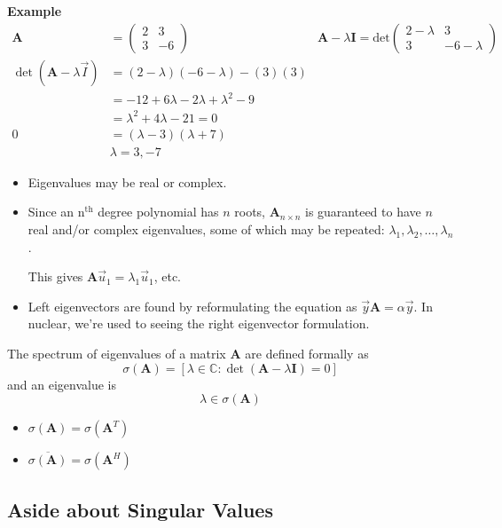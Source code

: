 \documentclass[12pt]{article}
\newcommand{\nth}{n\ensuremath{^{\text{th}}} }
\newcommand{\ve}[1]{\ensuremath{\mathbf{#1}}}
\newcommand{\cc}[1]{\ensuremath{\overline{#1}}}
\begin{document}
\textbf{Example}
\begin{align}
    \ve{A} &= \begin{pmatrix}
        2 & 3 \\
        3 & -6
    \end{pmatrix} 
    &\ve{A} - \lambda \ve{I} = \text{det}\begin{pmatrix}
        2 - \lambda & 3 \\
        3 & -6 - \lambda
    \end{pmatrix} \nonumber \\
%  
\det(\ve{A} - \lambda \vec{I}) &= (2 - \lambda)(-6 - \lambda) - (3)(3) \nonumber \\
%
&= -12 + 6\lambda -2\lambda + \lambda^2 -9 \nonumber \\
&= \lambda^2 + 4\lambda -21 = 0 \nonumber \\
0 &= (\lambda - 3)(\lambda + 7) \nonumber \\
&\boxed{\lambda = 3, -7} \nonumber
\end{align} 


\begin{itemize}
\item Eigenvalues may be real or complex. 

\item Since an \nth degree polynomial has $n$ roots, $\ve{A}_{n \times n}$ is guaranteed to have $n$ real and/or complex eigenvalues, some of which may be repeated: $\lambda_1, \lambda_2, \dots, \lambda_n$.

This gives $\ve{A}\vec{u}_1 = \lambda_1 \vec{u}_1$, etc.

\item Left eigenvectors are found by reformulating the equation as $\vec{y}\ve{A} = \alpha \vec{y}$. In nuclear, we're used to seeing the right eigenvector formulation.
\end{itemize}


The spectrum of eigenvalues of a matrix $\ve{A}$ are defined formally as
\[\sigma(\ve{A}) = [ \lambda \in \mathbb{C} : \det(\ve{A} - \lambda \ve{I})=0] \] 
and an eigenvalue is 
\[ \lambda \in \sigma(\ve{A}) \]
%
\begin{itemize}
\item $\sigma(\ve{A}) = \sigma(\ve{A}^T)$
\item $\cc{\sigma(\ve{A})} = \sigma(\ve{A}^H)$
\end{itemize}

\subsection{Aside about Singular Values}
\end{document}
